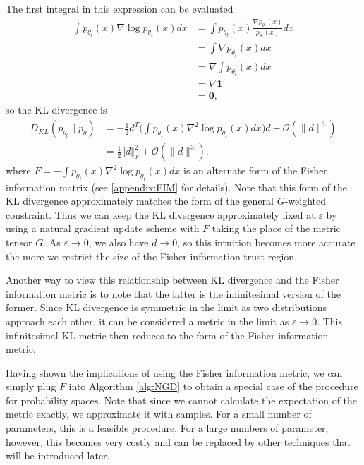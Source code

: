 \documentclass[twoside,10pt]{article}
\begin{document}
The first integral in this expression can be evaluated
\begin{align*}
    \int p_{\theta_t}(x) \nabla \log p_{\theta_t}(x) dx &= \int p_{\theta_t}(x) \frac{\nabla p_{\theta_t}(x)}{p_{\theta_t}(x)} dx \\
    &= \int \nabla p_{\theta_t}(x) dx \\
    &= \nabla \int p_{\theta_t}(x) dx \\
    &= \nabla \mathbf{1} \\
    &= \mathbf{0},
\end{align*}
so the KL divergence is
\begin{align*}
    D_{KL}(p_{\theta_t} \;\Vert\; p_\theta) &= - \frac{1}{2} d^T \Big( \int p_{\theta_t}(x) \nabla^2 \log p_{\theta_t}(x) dx \Big) d + \mathcal{O}(\|d\|^3) \\
    &= \frac{1}{2} \Vert d \Vert^2_F + \mathcal{O}(\|d\|^3).
\end{align*}
where $F = -\int p_{\theta_t}(x) \nabla^2 \log p_{\theta_t}(x) dx$ is an alternate form of the Fisher information matrix (see \ref{appendix:FIM} for details). Note that this form of the KL divergence approximately matches the form of the general $G$-weighted constraint. Thus we can keep the KL divergence approximately fixed at $\varepsilon$ by using a natural gradient update scheme with $F$ taking the place of the metric tensor $G$. As $\varepsilon \to 0$, we also have $d \to 0$, so this intuition becomes more accurate the more we restrict the size of the Fisher information trust region.

Another way to view this relationship between KL divergence and the Fisher information metric is to note that the latter is the infinitesimal version of the former. Since KL divergence is symmetric in the limit as two distributions approach each other, it can be considered a metric in the limit as $\varepsilon \to 0$. This infinitesimal KL metric then reduces to the form of the Fisher information metric.

Having shown the implications of using the Fisher information metric, we can simply plug $F$ into Algorithm \ref{alg:NGD} to obtain a special case of the procedure for probability spaces. Note that since we cannot calculate the expectation of the metric exactly, we approximate it with samples. For a small number of parameters, this is a feasible procedure. For a large numbers of parameter, however, this becomes very costly and can be replaced by other techniques that will be introduced later.
\end{document}
